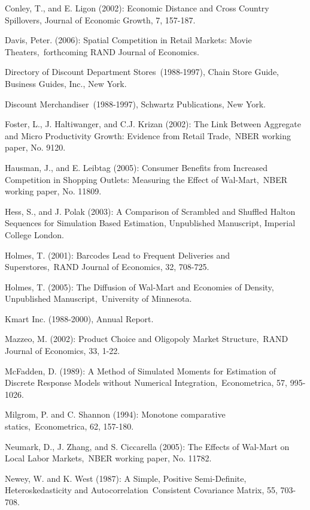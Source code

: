 \documentclass[notitlepage,onecolumn,11pt]{article}
\begin{document}
\begin{thebibliography}{99}
\bibitem{} Conley, T., and E. Ligon (2002): Economic Distance and Cross
Country Spillovers, Journal of Economic Growth, 7, 157-187.

 Davis, Peter. (2006): Spatial Competition in Retail Markets:
Movie Theaters,\ forthcoming RAND Journal of Economics.

 Directory of Discount Department Stores\ (1988-1997), Chain
Store Guide, Business Guides, Inc., New York.

 Discount Merchandiser\ (1988-1997), Schwartz Publications, New
York.

 Foster, L., J. Haltiwanger, and C.J. Krizan (2002): The Link
Between Aggregate and Micro Productivity Growth: Evidence from Retail
Trade,\ NBER working paper, No. 9120.

 Hausman, J., and E. Leibtag (2005): Consumer Benefits from
Increased Competition in Shopping Outlets: Measuring the Effect of
Wal-Mart,\ NBER working paper, No. 11809.

\bibitem{} Hess, S., and J. Polak (2003): A Comparison of Scrambled and
Shuffled Halton Sequences for Simulation Based Estimation, Unpublished
Manuscript, Imperial College London.

 Holmes, T. (2001): Barcodes Lead to Frequent Deliveries and
Superstores,\ RAND Journal of Economics, 32, 708-725.

 Holmes, T. (2005): The Diffusion of Wal-Mart and Economies of
Density, Unpublished Manuscript,\ University of Minnesota.

 Kmart Inc. (1988-2000), Annual Report.

 Mazzeo, M. (2002): Product Choice and Oligopoly Market
Structure,\ RAND Journal of Economics, 33, 1-22.

 McFadden, D. (1989): A Method of Simulated Moments for
Estimation of Discrete Response Models without Numerical Integration,\
Econometrica, 57, 995-1026.

\bibitem{} Milgrom, P. and C. Shannon (1994): Monotone comparative statics,\
Econometrica, 62, 157-180.

 Neumark, D., J. Zhang, and S. Ciccarella (2005): The
Effects of Wal-Mart on Local Labor Markets,\ NBER working paper, No. 11782.

\bibitem{} Newey, W. and K. West (1987): A Simple, Positive Semi-Definite,
Heteroskedasticity and Autocorrelation\ Consistent Covariance Matrix, 55,
703-708.


\end{thebibliography}
\end{document}
